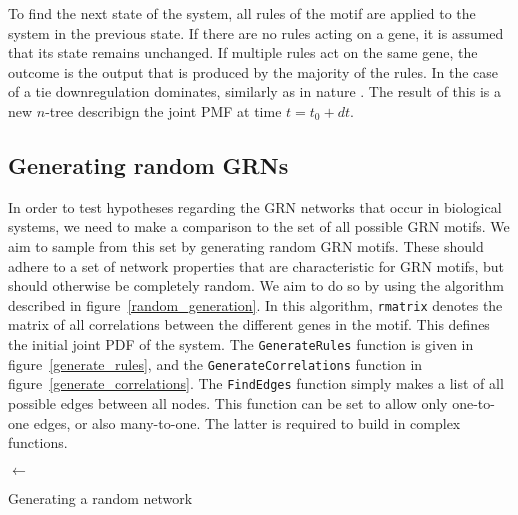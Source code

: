 \documentclass[../main.tex]{subfiles}
\begin{document}
To find the next state of the system, all rules of the motif are applied to the system in the previous state.
If there are no rules acting on a gene, it is assumed that its state remains unchanged.
If multiple rules act on the same gene, the outcome is the output that is produced by the majority of the rules.
In the case of a tie downregulation dominates, similarly as in nature \cite{}.
The result of this is a new $n$-tree describign the joint PMF at time $t=t_0+dt$.

\subsection{Generating random GRNs}

In order to test hypotheses regarding the GRN networks that occur in biological systems, we need to make a comparison to the set of all possible GRN motifs.
We aim to sample from this set by generating random GRN motifs.
These should adhere to a set of network properties that are characteristic for GRN motifs, but should otherwise be completely random.
We aim to do so by using the algorithm described in figure~\ref{random_generation}.
In this algorithm, \texttt{rmatrix} denotes the matrix of all correlations between the different genes in the motif.
This defines the initial joint PDF of the system.
The \texttt{GenerateRules} function is given in figure~\ref{generate_rules}, and the \texttt{GenerateCorrelations} function in figure~\ref{generate_correlations}.
The \texttt{FindEdges} function simply makes a list of all possible edges between all nodes.
This function can be set to allow only one-to-one edges, or also many-to-one.
The latter is required to build in complex functions.


\begin{algorithm}[H]

 \BlankLine

 \Edges $\leftarrow$ \FindEdges{\Nodes} 
 \label{random_generation}
 \caption{Generating a random network}
\end{algorithm}
\end{document}
